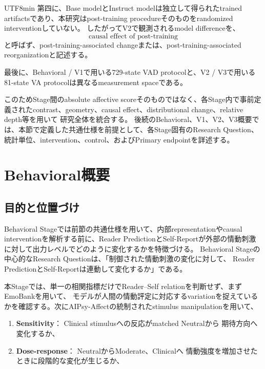 \documentclass{article} %
\begin{document}
\begin{CJK*}{UTF8}{min}
第四に、Base modelとInstruct modelは独立して得られたtrained artifactsであり、本研究はpost-training procedureそのものをrandomized interventionしていない。
したがってV2で観測されるmodel differenceを、
\[
\text{causal effect of post-training}
\]
と呼ばず、post-training-associated changeまたは、post-training-associated reorganizationと記述する。

最後に、Behavioral / V1で用いる729-state VAD protocolと、V2 / V3で用いる81-state VA protocolは異なるmeasurement spaceである。

このためStage間のabsolute affective scoreそのものではなく、各Stage内で事前定義されたcontrast、geometry、causal effect、distributional change、relative depth等を用いて
研究全体を統合する。
後続のBehavioral、V1、V2、V3概要では、本節で定義した共通仕様を前提として、各Stage固有のResearch Question、統計単位、intervention、control、およびPrimary endpointを詳述する。



\section{Behavioral概要}
\label{app:behavioral-methods}

\subsection{目的と位置づけ}
Behavioral Stageでは前節の共通仕様を用いて、内部representationやcausal interventionを解析する前に、Reader PredictionとSelf-Reportが外部の情動刺激に対して出力レベルでどのように変化するかを特徴づける。
Behavioral Stageの中心的なResearch Questionは、「制御された情動刺激の変化に対して、
Reader PredictionとSelf-Reportは連動して変化するか」である。

本Stageでは、単一の相関指標だけでReader--Self relationを判断せず、まずEmoBankを用いて、
モデルが人間の情動評定に対応するvariationを捉えているかを確認する。次にAIPsy-Affectの統制されたstimulus manipulationを用いて、
\begin{enumerate}
    \item \textbf{Sensitivity}：
    Clinical stimulusへの反応がmatched Neutralから
    期待方向へ変化するか、

    \item \textbf{Dose-response}：
    NeutralからModerate、Clinicalへ
    情動強度を増加させたときに段階的な変化が生じるか、


\end{enumerate}
\end{CJK*}
\end{document}
